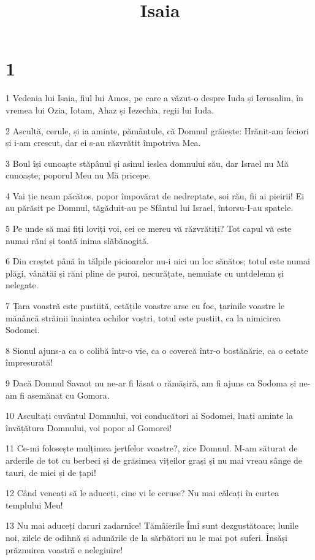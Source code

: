

\title{Isaia}


\chapter{1}

\par 1 Vedenia lui Isaia, fiul lui Amos, pe care a văzut-o despre Iuda și Ierusalim, în vremea lui Ozia, Iotam, Ahaz și Iezechia, regii lui Iuda.
\par 2 Ascultă, cerule, și ia aminte, pământule, că Domnul grăiește: Hrănit-am feciori și i-am crescut, dar ei s-au răzvrătit împotriva Mea.
\par 3 Boul își cunoaște stăpânul și asinul ieslea domnului său, dar Israel nu Mă cunoaște; poporul Meu nu Mă pricepe.
\par 4 Vai ție neam păcătos, popor împovărat de nedreptate, soi rău, fii ai pieirii! Ei au părăsit pe Domnul, tăgăduit-au pe Sfântul lui Israel, întorsu-I-au spatele.
\par 5 Pe unde să mai fiți loviți voi, cei ce mereu vă răzvrătiți? Tot capul vă este numai răni și toată inima slăbănogită.
\par 6 Din creștet până în tălpile picioarelor nu-i nici un loc sănătos; totul este numai plăgi, vânătăi și răni pline de puroi, necurățate, nemuiate cu untdelemn și nelegate.
\par 7 Țara voastră este pustiită, cetățile voastre arse cu foc, țarinile voastre le mănâncă străinii înaintea ochilor voștri, totul este pustiit, ca la nimicirea Sodomei.
\par 8 Sionul ajuns-a ca o colibă într-o vie, ca o covercă într-o bostănărie, ca o cetate împresurată!
\par 9 Dacă Domnul Savaot nu ne-ar fi lăsat o rămășiră, am fi ajuns ca Sodoma și ne-am fi asemănat cu Gomora.
\par 10 Ascultați cuvântul Domnului, voi conducători ai Sodomei, luați aminte la învățătura Domnului, voi popor al Gomorei!
\par 11 Ce-mi folosește mulțimea jertfelor voastre?, zice Domnul. M-am săturat de arderile de tot cu berbeci și de grăsimea vițeilor grași și nu mai vreau sânge de tauri, de miei și de țapi!
\par 12 Când veneați să le aduceți, cine vi le ceruse? Nu mai călcați în curtea templului Meu!
\par 13 Nu mai aduceți daruri zadarnice! Tămâierile Îmi sunt dezgustătoare; lunile noi, zilele de odihnă și adunările de la sărbători nu le mai pot suferi. Însăși prăznuirea voastră e nelegiuire!
